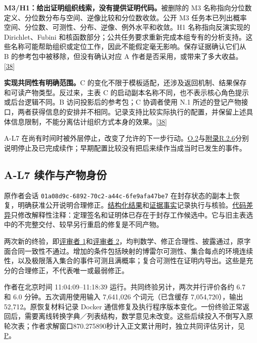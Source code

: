 \textbf{M3/H1：给出证明组织线索，没有提供证明代码。}被删除的 M3 名称指向分位数定义、分位数分布与空间、逆像比较和分位数收敛。公开 M3 任务本已列出概率空间、分位数、可测性、分布、逆像、例外水平和收敛。H1 名称指向反演实现的 Dirichlet、Fubini 和核函数部分；公共任务要求重新完成本组专有的分析支持。这些名称可能帮助组织或定位工作，因此不能假定毫无影响。保存证据确认它们从 B 的参考包中被移除，但没有确认对应 A 作者是否采用，或带来了多大收益。\href{zh.pdf\#ref-38}{\mbox{[38]}}

\textbf{实现共同性有明确范围。}C 的变化不限于模板适配，还涉及返回机制、结果保存和可读产物类型。反过来，主表 C 的启动副本名称不同，也不表示核心角色提示或后台逻辑不同。B 访问投影后的参考包；C 协调者使用 N.1 所述的登记产物接口，两者获得信息的安排并不相同。记录支持比较实际执行的配置，并保留上述具体信息限制，不能分离估计组织方式本身的效果。\href{zh.pdf\#ref-38}{\mbox{[38]}}

A-L7 在尚有时间时被外层停止，改变了允许的下一步行动。\hyperlink{o2}{O.2}与\hyperlink{r2-6}{附录R.2.6}分别说明停止及已完成续作；早期配置比较没有把后来续作当成当时已发生的事件。

\subsection[A-L7 续作与产物身份]{\texorpdfstring{\protect\hypertarget{o2}{}A-L7 续作与产物身份}{A-L7 续作与产物身份}}
原作者会话 \nolinkurl{01a08d9c-6892-70c2-a44c-6fe9afa47be7} 在封存状态的副本上恢复，明确获准公开说明合理修正。\href{verification/revision13/a-l7/RESULTS.json}{结构化结果}和\href{verification/revision13/a-l7/FINAL_EVIDENCE.json}{证据事实}记录执行与核验。\href{verification/revision13/a-l7/sealed-candidate-to-final.diff}{代码差异}只修改解释性注释：定理签名和证明体已存在于封存工作候选中。它与旧主表选中的不完整交付、较早另行重启的修复是不同产物。

两次新的终验，即\href{verification/revision13/a-l7/endpoint/reviewer-1/VALIDATED_RESULT.json}{评审者 1}和\href{verification/revision13/a-l7/endpoint/reviewer-2/VALIDATED_RESULT.json}{评审者 2}，均判数学、修正合理性、披露通过，原字面合同一致性不通过。增加的条件包括映射的博雷尔可测性、集合每点的环境连续性，以及极限落入集合的事件可测且满概率；复合可测性在证明内导出。这些是充分的合理修正，不代表唯一或最弱修正。

作者在北京时间 11:04:09–11:18:39 运行。共同终验另计，两次并行评价各约 6.7 和 6.0 分钟。五次调用使用输入 7,641,026 个词元（已含缓存 7,054,720），输出 52,712。原恢复材料记录 Docker 通信修复及执行程序版本变化。一份终验正常返回后，需要离线转换字典／列表结构，数学意见未改变。这些后续投入不倒写入原轮次表；作者求解窗口870.275890秒计入正文累计用时，独立共同评估另计，见\hyperlink{appendix-p}{P}。

